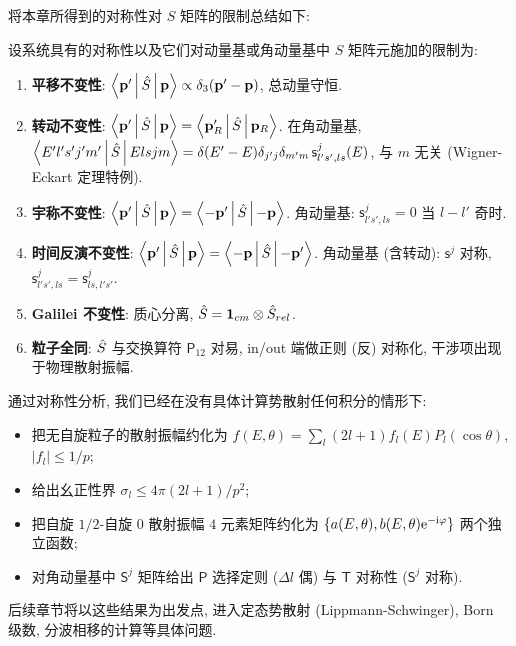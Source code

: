 将本章所得到的对称性对 $S$ 矩阵的限制总结如下:

\begin{theorem}[$S$ 矩阵对称性总结]
设系统具有的对称性以及它们对动量基或角动量基中 $S$ 矩阵元施加的限制为:
\begin{enumerate}
  \item \textbf{平移不变性}: $\left\langle \mathbf{p}' \,\middle|\, \hat{S} \,\middle|\, \mathbf{p} \right\rangle\propto \delta_3(\mathbf{p}'-\mathbf{p})$, 总动量守恒.
  \item \textbf{转动不变性}: $\left\langle \mathbf{p}' \,\middle|\, \hat{S} \,\middle|\, \mathbf{p} \right\rangle=\left\langle \mathbf{p}'_R \,\middle|\, \hat{S} \,\middle|\, \mathbf{p}_R \right\rangle$. 在角动量基, $\left\langle E'l's'j'm' \,\middle|\, \hat{S} \,\middle|\, Elsjm \right\rangle=\delta(E'-E)\delta_{j'j}\delta_{m'm}\,\mathsf{s}^j_{l's',ls}(E)$, 与 $m$ 无关 (Wigner-Eckart 定理特例).
  \item \textbf{宇称不变性}: $\left\langle \mathbf{p}' \,\middle|\, \hat{S} \,\middle|\, \mathbf{p} \right\rangle=\left\langle -\mathbf{p}' \,\middle|\, \hat{S} \,\middle|\, -\mathbf{p} \right\rangle$. 角动量基: $\mathsf{s}^j_{l's',ls}=0$ 当 $l-l'$ 奇时.
  \item \textbf{时间反演不变性}: $\left\langle \mathbf{p}' \,\middle|\, \hat{S} \,\middle|\, \mathbf{p} \right\rangle=\left\langle -\mathbf{p} \,\middle|\, \hat{S} \,\middle|\, -\mathbf{p}' \right\rangle$. 角动量基 (含转动): $\mathsf{s}^j$ 对称, $\mathsf{s}^j_{l's',ls}=\mathsf{s}^j_{ls,l's'}$.
  \item \textbf{Galilei 不变性}: 质心分离, $\hat{S}=\mathbf{1}_{cm}\otimes \hat{S}_{rel}$.
  \item \textbf{粒子全同}: $\hat{S}$ 与交换算符 $\mathsf{P}_{12}$ 对易, in/out 端做正则 (反) 对称化, 干涉项出现于物理散射振幅.
\end{enumerate}
\end{theorem}

\begin{remark}
通过对称性分析, 我们已经在没有具体计算势散射任何积分的情形下:
\begin{itemize}
  \item 把无自旋粒子的散射振幅约化为 $f(E,\theta)=\sum_l (2l+1)f_l(E)P_l(\cos\theta)$, $|f_l|\le 1/p$;
  \item 给出幺正性界 $\sigma_l\le 4\pi(2l+1)/p^2$;
  \item 把自旋 $1/2$-自旋 $0$ 散射振幅 $4$ 元素矩阵约化为 $\{a(E,\theta), b(E,\theta)\mathrm{e}^{-\mathrm{i}\varphi}\}$ 两个独立函数;
  \item 对角动量基中 $\mathsf{S}^j$ 矩阵给出 $\mathsf{P}$ 选择定则 ($\Delta l$ 偶) 与 $\mathsf{T}$ 对称性 ($\mathsf{S}^j$ 对称).
\end{itemize}
后续章节将以这些结果为出发点, 进入定态势散射 (Lippmann-Schwinger), Born 级数, 分波相移的计算等具体问题.
\end{remark}


